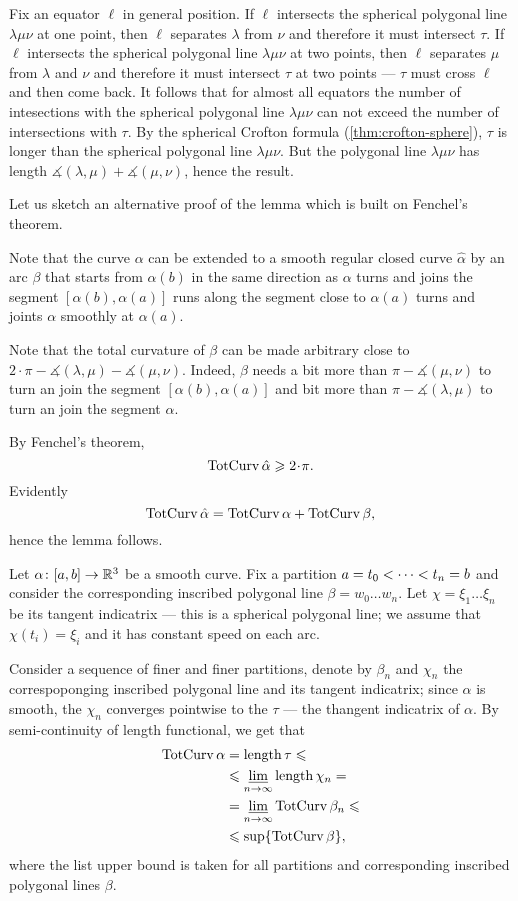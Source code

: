 Fix an equator $\ell$ in general position.
If $\ell$ intersects the spherical polygonal line $\lambda \mu \nu$ at one point, then $\ell$ separates $\lambda$ from $\nu$ and therefore it must intersect $\tau$.
If $\ell$ intersects the spherical polygonal line $\lambda \mu \nu$ at two points, then $\ell$ separates $\mu$ from $\lambda$ and $\nu$ and therefore it must intersect $\tau$ at two points --- $\tau$ must cross $\ell$ and then come back.
It follows that for almost all equators the number of intesections with the spherical polygonal line $\lambda \mu\nu$ can not exceed the number of intersections with $\tau$.
By the spherical Crofton formula (\ref{thm:crofton-sphere}), $\tau$ is longer than the spherical polygonal line $\lambda \mu\nu$.
But the polygonal line $\lambda \mu\nu$ has length $\measuredangle (\lambda,\mu)+\measuredangle (\mu,\nu)$, hence the result.
\qeds

Let us sketch an alternative proof of the lemma which is built on Fenchel's theorem. 

Note that the curve $\alpha$ can be extended to a smooth regular closed curve $\hat\alpha$ by an arc $\beta$ that starts from $\alpha(b)$ in the same direction as $\alpha$ turns and joins the segment $[\alpha(b),\alpha(a)]$ runs along the segment close to $\alpha(a)$ turns and joints $\alpha$ smoothly at $\alpha(a)$.

Note that the total curvature of $\beta$ can be made arbitrary close to $2\cdot\pi -\measuredangle (\lambda,\mu)-\measuredangle (\mu,\nu)$.
Indeed, $\beta$ needs a bit more than $\pi -\measuredangle (\mu,\nu)$ to turn an join the segment $[\alpha(b),\alpha(a)]$ and bit more than $\pi -\measuredangle (\lambda,\mu)$ to turn an join the segment $\alpha$.

By Fenchel's theorem,
\[\tc\hat\alpha\ge 2\cdot \pi.\]
Evidently 
\[\mathop{\rm TotCurv}\nolimits\hat\alpha=\mathop{\rm TotCurv}\nolimits\alpha+\mathop{\rm TotCurv}\nolimits\beta,\]
hence the lemma follows.
\qeds


Let $\alpha\colon[a,b]\to\mathbb{R}^3$ be a smooth curve.
Fix a partition $a\z=t_0<\dots<t_n=b$ and consider the corresponding inscribed polygonal line $\beta=w_0\dots w_n$.
Let $\chi=\xi_1\dots\xi_n$ be its tangent indicatrix --- this is a spherical polygonal line;
we assume that $\chi(t_i)=\xi_i$ and it has constant speed on each arc.

Consider a sequence of finer and finer partitions, denote by $\beta_n$ and $\chi_n$ the correspoponging inscribed polygonal line and its tangent indicatrix;
since $\alpha$ is smooth, the $\chi_n$ converges pointwise to the $\tau$ --- the thangent indicatrix of $\alpha$.
By semi-continuity of length functional, we get that 
\begin{align*}
\mathop{\rm TotCurv}\nolimits\alpha&=\mathop{\rm length}\nolimits \tau\leqslant  
\\
&\leqslant \varliminf_{n\to\infty}\mathop{\rm length}\nolimits \chi_n=
\\
&= \varliminf_{n\to\infty}\mathop{\rm TotCurv}\nolimits \beta_n\leqslant
\\
&\leqslant \sup\{\mathop{\rm TotCurv}\nolimits\beta\},
\end{align*}
where the list upper bound is taken for all partitions and corresponding inscribed polygonal lines $\beta$.

